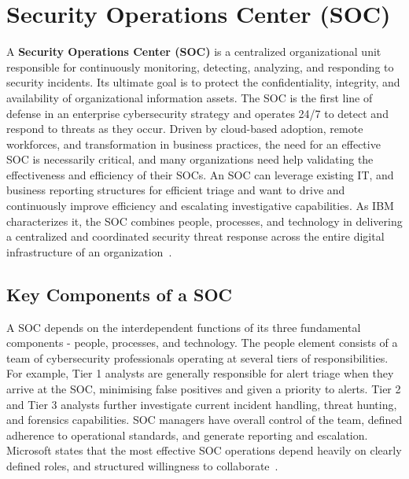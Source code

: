 \section{Security Operations Center (SOC)}\vspace{-0.5em}

A \textbf{Security Operations Center (SOC)} is a centralized organizational unit responsible for continuously monitoring, detecting, analyzing, and responding to security incidents. Its ultimate goal is to protect the confidentiality, integrity, and availability of organizational information assets. The SOC is the first line of defense in an enterprise cybersecurity strategy and operates 24/7 to detect and respond to threats as they occur. Driven by cloud-based adoption, remote workforces, and transformation in business practices, the need for an effective SOC is necessarily critical, and many organizations need help validating the effectiveness and efficiency of their SOCs. An SOC can leverage existing IT, and business reporting structures for efficient triage and want to drive and continuously improve efficiency and escalating investigative capabilities. As IBM characterizes it, the SOC combines people, processes, and technology in delivering a centralized and coordinated security threat response across the entire digital infrastructure of an organization~\cite{ibm}.
\vspace{-2em}
\subsection{Key Components of a SOC}

\vspace{-0.5em}
A SOC depends on the interdependent functions of its three fundamental components - people, processes, and technology. The people element consists of a team of cybersecurity professionals operating at several tiers of responsibilities. For example, Tier 1 analysts are generally responsible for alert triage when they arrive at the SOC, minimising false positives and given a priority to alerts. Tier 2 and Tier 3 analysts further investigate current incident handling, threat hunting, and forensics capabilities. SOC managers have overall control of the team, defined adherence to operational standards, and generate reporting and escalation. Microsoft states that the most effective SOC operations depend heavily on clearly defined roles, and structured willingness to collaborate~\cite{microsoft}. 

